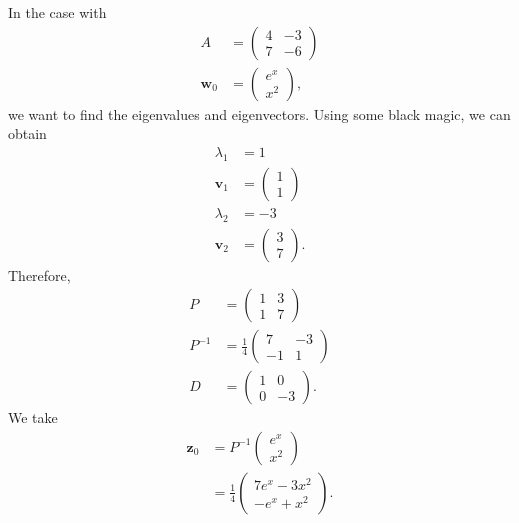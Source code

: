 \documentclass[10pt]{mypackage}
\begin{document}
\begin{example}
  In the case with
  \begin{align*}
    A &= \begin{pmatrix}4 & -3 \\ 7 & -6\end{pmatrix}\\
    \mathbf{w}_0 &= \begin{pmatrix}e^x\\x^2\end{pmatrix},
  \end{align*}
  we want to find the eigenvalues and eigenvectors. Using some black magic, we can obtain
  \begin{align*}
    \lambda_1 &= 1\\
    \mathbf{v}_1 &= \begin{pmatrix}1\\1\end{pmatrix}\\
    \lambda_2 &= -3\\
    \mathbf{v}_2 &= \begin{pmatrix}3\\7\end{pmatrix}.
  \end{align*}
  Therefore,
  \begin{align*}
    P &= \begin{pmatrix}1 & 3 \\ 1 & 7\end{pmatrix}\\
    P^{-1} &= \frac{1}{4} \begin{pmatrix}7 & -3 \\ -1 & 1\end{pmatrix}\\
    D &= \begin{pmatrix}1 & 0 \\ 0 & -3\end{pmatrix}.
  \end{align*}
  We take
  \begin{align*}
    \mathbf{z}_0 &= P^{-1} \begin{pmatrix}e^{x}\\x^2\end{pmatrix}\\
                 &= \frac{1}{4} \begin{pmatrix}7e^{x} - 3x^2\\ -e^{x} + x^2\end{pmatrix}.
  \end{align*}

\end{example}
\end{document}

